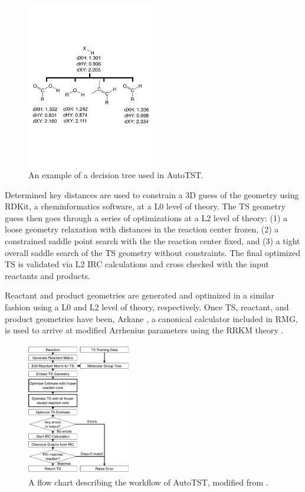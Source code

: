\documentclass[preprint, 11pt]{elsarticle} %
\begin{document}
\begin{figure}[htbp]
    \centering
    \includegraphics[width=0.5\textwidth]{autotst_tree}
    \caption{An example of a decision tree used in AutoTST.}
    \label{fig:autotst_tree}
\end{figure}

Determined key distances are used to constrain a 3D guess of the geometry using RDKit, a cheminformatics software, \cite{RDKit:2018} at a L0 level of theory.
The TS geometry guess then goes through a series of optimizations at a L2 level of theory: (1) a loose geometry relaxation with distances in the reaction center frozen, (2) a constrained saddle point search with the the reaction center fixed, and (3) a tight overall saddle search of the TS geometry without constraints.
The final optimized TS is validated via L2 IRC calculations and cross checked with the input reactants and products.

Reactant and product geometries are generated and optimized in a similar fashion using a L0 and L2 level of theory, respectively. 
Once TS, reactant, and product geometries have been, Arkane \cite{gao:2016}, a canonical calculator included in RMG, is used to arrive at modified Arrhenius parameters using the RRKM theory \cite{RRKM:1999, RRKM:2015}.


\begin{figure}[htbp]
    \centering
    \includegraphics[width=0.4\textwidth]{autotst_overview}
    \caption{A flow chart describing the workflow of AutoTST, modified from \cite{bhoorasingh:2017}.}
    \label{fig:autotst_overview}
\end{figure}
\end{document}
